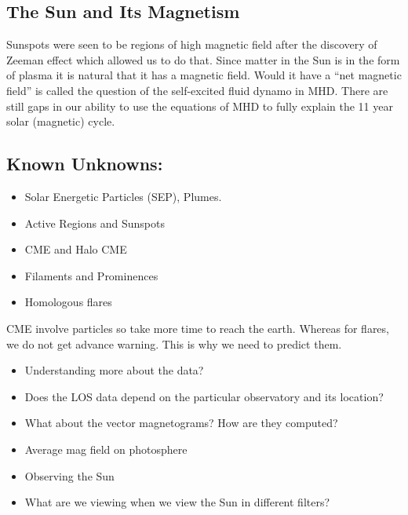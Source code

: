\documentclass{../template/texnote}
\begin{document}
\subsection{The Sun and Its Magnetism}
Sunspots were seen to be regions of high magnetic field after the discovery of Zeeman effect which allowed us to do that. Since matter in the Sun is in the form of plasma it is natural that it has a magnetic field. Would it have a “net magnetic field” is called the question of the self-excited fluid dynamo in MHD. There are still gaps in our ability to use the equations of MHD to fully explain the 11 year solar (magnetic) cycle.


\subsection{Known Unknowns:}
\begin{itemize}
	\item Solar Energetic Particles (SEP), Plumes.
	\item Active Regions and Sunspots
	\item CME and Halo CME
	\item Filaments and Prominences
	\item Homologous flares

\end{itemize}
CME involve particles so take more time to reach the earth. Whereas for flares, we do not get advance warning. This is why we need to predict them. 

\begin{itemize}
	\item Understanding more about the data?
	\item Does the LOS data depend on the particular observatory and its location?
	\item What about the vector magnetograms? How are they computed? 
	\item Average mag field on photosphere
	\item Observing the Sun
	\item What are we viewing when we view the Sun in different filters?
\end{itemize}
\end{document}
